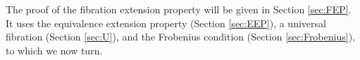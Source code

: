 \documentclass[11pt]{amsart}
\newcommand{\ednote}[1]{[\textit{\color{red}{#1}}]} %
\newcommand{\CC}{\ensuremath{\mathcal{C}}}
\newcommand{\WW}{\ensuremath{\mathcal{W}}}
\newcommand{\FF}{\ensuremath{\mathcal{F}}}
\newtheorem{theorem}{Theorem}
\theoremstyle{remark}
\theoremstyle{definition}
\begin{document}
%

The proof of the fibration extension property will be given in Section \ref{sec:FEP}.  It uses the equivalence extension property (Section \ref{sec:EEP}), a universal fibration (Section \ref{sec:U}), and the Frobenius condition (Section \ref{sec:Frobenius}), to which we now turn.
\end{document}
